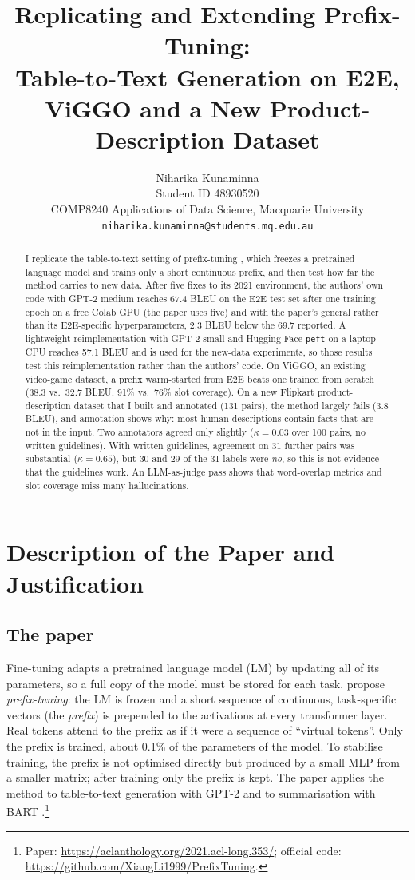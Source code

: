\documentclass[11pt]{article}
\title{Replicating and Extending Prefix-Tuning:\\ Table-to-Text Generation on E2E, ViGGO and a New Product-Description Dataset}
\author{Niharika Kunaminna \\
  Student ID 48930520 \\
  COMP8240 Applications of Data Science, Macquarie University \\
  \texttt{niharika.kunaminna@students.mq.edu.au}}
\begin{document}
\maketitle

\begin{abstract}
I replicate the table-to-text setting of prefix-tuning \citep{li-liang-2021-prefix}, which freezes a pretrained language model and trains only a short continuous prefix, and then test how far the method carries to new data. After five fixes to its 2021 environment, the authors' own code with GPT-2 medium reaches 67.4 BLEU on the E2E test set after one training epoch on a free Colab GPU (the paper uses five) and with the paper's general rather than its E2E-specific hyperparameters, 2.3 BLEU below the 69.7 reported. A lightweight reimplementation with GPT-2 small and Hugging Face \texttt{peft} on a laptop CPU reaches 57.1 BLEU and is used for the new-data experiments, so those results test this reimplementation rather than the authors' code. On ViGGO, an existing video-game dataset, a prefix warm-started from E2E beats one trained from scratch (38.3 vs.\ 32.7 BLEU, 91\% vs.\ 76\% slot coverage). On a new Flipkart product-description dataset that I built and annotated (131 pairs), the method largely fails (3.8 BLEU), and annotation shows why: most human descriptions contain facts that are not in the input. Two annotators agreed only slightly ($\kappa = 0.03$ over 100 pairs, no written guidelines). With written guidelines, agreement on 31 further pairs was substantial ($\kappa = 0.65$), but 30 and 29 of the 31 labels were \emph{no}, so this is not evidence that the guidelines work. An LLM-as-judge pass shows that word-overlap metrics and slot coverage miss many hallucinations.
\end{abstract}

\section{Description of the Paper and Justification}

\subsection{The paper}
Fine-tuning adapts a pretrained language model (LM) by updating all of its parameters, so a full copy of the model must be stored for each task. \citet{li-liang-2021-prefix} propose \emph{prefix-tuning}: the LM is frozen and a short sequence of continuous, task-specific vectors (the \emph{prefix}) is prepended to the activations at every transformer layer. Real tokens attend to the prefix as if it were a sequence of ``virtual tokens''. Only the prefix is trained, about 0.1\% of the parameters of the model. To stabilise training, the prefix is not optimised directly but produced by a small MLP from a smaller matrix; after training only the prefix is kept. The paper applies the method to table-to-text generation with GPT-2 \citep{radford-etal-2019-gpt2} and to summarisation with BART \citep{lewis-etal-2020-bart}.\footnote{Paper: \url{https://aclanthology.org/2021.acl-long.353/}; official code: \url{https://github.com/XiangLi1999/PrefixTuning}.}
\end{document}
